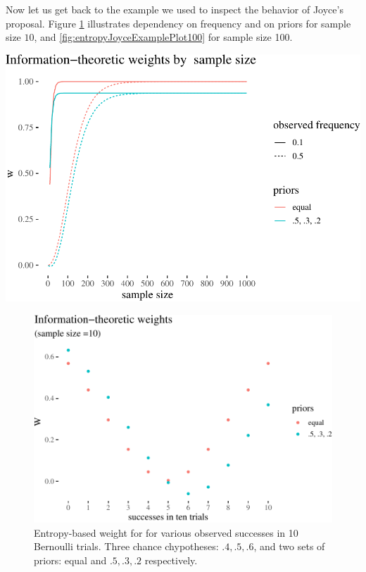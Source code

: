\documentclass[
  10pt,
  dvipsnames,enabledeprecatedfontcommands]{scrartcl}
\begin{document}
Now let us get back to the example we used to inspect the behavior of
Joyce's proposal. Figure \ref{fig:entropyJoyceExamplePlot} illustrates
dependency on frequency and on priors for sample size \(10\), and
\ref{fig:entropyJoyceExamplePlot100} for sample size 100.

\begin{center}\includegraphics[width=1\linewidth]{imprecision_weight_files/figure-latex/entropyJoyceExample-1} \end{center}

\begin{figure}

\begin{center}\includegraphics[width=1\linewidth]{imprecision_weight_files/figure-latex/entropyJoyceExamplePlot10-1} \end{center}

\caption{Entropy-based weight for for various observed successes in 10 Bernoulli trials. Three chance chypotheses: $.4, .5, .6$, and two sets of priors: equal and $.5, .3, .2$ respectively.}
\label{fig:entropyJoyceExamplePlot}
\end{figure}
\end{document}

